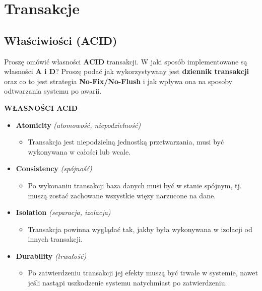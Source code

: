 \section{Transakcje}
\label{sec:transakcje}

\subsection{Właściwiości (ACID)}
\label{subsec:wlasciwiosci}

\horrule{0.5pt}
Proszę omówić własności \textbf{ACID} transakcji. W jaki sposób
implementowane są własności \textbf{A i D}? Proszę podać jak
wykorzystywany jest \textbf{dziennik transakcji} oraz co to jest
strategia \textbf{No-Fix/No-Flush} i jak wpływa ona na sposoby
odtwarzania systemu po awarii.\\
\horrule{0.5pt}

\textbf{WŁASNOŚCI ACID}
\begin{itemize}
    \item \textbf{Atomicity} \textit{(atomowość, niepodzielność)}
    \begin{itemize}
        \item Transakcja jest niepodzielną jednostką przetwarzania, musi
        być wykonywana w całości lub wcale.
    \end{itemize}

    \item \textbf{Consistency} \textit{(spójność)}
    \begin{itemize}
        \item Po wykonaniu transakcji baza danych musi być w stanie spójnym,
        tj. muszą zostać zachowane wszystkie więzy narzucone na dane.
    \end{itemize}

    \item \textbf{Isolation} \textit{(separacja, izolacja)}
    \begin{itemize}
        \item Transakcja powinna wyglądać tak, jakby była wykonywana w
        izolacji od innych transakcji.
    \end{itemize}

    \item \textbf{Durability} \textit{(trwałość)}
    \begin{itemize}
        \item Po zatwierdzeniu transakcji jej efekty muszą być trwałe w
        systemie, nawet jeśli nastąpi uszkodzenie systemu natychmiast
        po zatwierdzeniu.
    \end{itemize}

\end{itemize}

